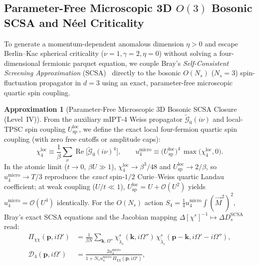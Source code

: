 \documentclass[11pt,a4paper]{article}
\numberwithin{equation}{section}
\theoremstyle{plain}
\theoremstyle{definition}
\newtheorem{approximation}{Approximation}[section]
\providecommand{\vk}{\mathbf{k}}
\providecommand{\vp}{\mathbf{p}}
\providecommand{\re}{\operatorname{Re}}
\begin{document}
\subsection{Parameter-Free Microscopic 3D $O(3)$ Bosonic SCSA and N\'eel Criticality}
\label{sec:l4_scsa}

To generate a momentum-dependent anomalous dimension $\eta > 0$ and escape Berlin--Kac
spherical criticality ($\nu = 1, \gamma = 2, \eta = 0$) without solving a four-dimensional
fermionic parquet equation, we couple Bray's \emph{Self-Consistent Screening Approximation}
(SCSA)~\cite{Bray1974} directly to the bosonic $O(N_s)$ ($N_s = 3$) spin-fluctuation
propagator in $d = 3$ using an exact, parameter-free microscopic quartic spin coupling.

\begin{approximation}[Parameter-Free Microscopic 3D Bosonic SCSA Closure (Level~IV)]
\label{approx:l4_scsa}
From the auxiliary mIPT-4 Weiss propagator $\tilde{\mathcal{G}}_0(i\nu)$ and local-TPSC
spin coupling $U_{\mathrm{sp}}^{\mathrm{loc}}$, we define the exact local four-fermion
quartic spin coupling (with zero free cutoffs or amplitude caps):
\begin{equation}
    \chi_4^{\mathrm{loc}}
    \equiv \frac{1}{\beta}\sum_{\nu} \re\!\bigl[\tilde{\mathcal{G}}_0(i\nu)^4\bigr],
    \qquad
    u_4^{\mathrm{micro}}
    \equiv \bigl(U_{\mathrm{sp}}^{\mathrm{loc}}\bigr)^4\, \max\!\bigl(\chi_4^{\mathrm{loc}}, 0\bigr).
    \label{eq:l4_u4_micro}
\end{equation}
In the atomic limit ($t \to 0$, $\beta U \gg 1$), $\chi_4^{\mathrm{loc}} \to \beta^3/48$
and $U_{\mathrm{sp}}^{\mathrm{loc}} \to 2/\beta$, so $u_4^{\mathrm{micro}} \to T/3$
reproduces the \emph{exact} spin-$1/2$ Curie--Weiss quartic Landau coefficient; at weak
coupling ($U/t \ll 1$), $U_{\mathrm{sp}}^{\mathrm{loc}} = U + \mathcal{O}(U^2)$ yields
$u_4^{\mathrm{micro}} = \mathcal{O}(U^4)$ identically. For the $O(N_s)$ action
$S_4 = \frac{1}{4} u_4^{\mathrm{micro}} \int (\vec{M}^2)^2$, Bray's exact SCSA equations
and the Jacobian mapping $\Delta[\chi^s]^{-1} \mapsto \Delta D_s^{\mathrm{SCSA}}$ read:
\begin{align}
    \Pi_{\chi\chi}(\vp, i\Omega')
    &= \frac{1}{\beta N}\sum_{\vk,\Omega''}
       \chi^s_{\tilde{\lambda}_s}(\vk, i\Omega'')\,
       \chi^s_{\tilde{\lambda}_s}(\vp - \vk, i\Omega' - i\Omega''),
    \label{eq:l4_Pixx} \\
    \mathcal{D}_4(\vp, i\Omega')
    &= \frac{2 u_4^{\mathrm{micro}}}{1 + N_s u_4^{\mathrm{micro}}\,\Pi_{\chi\chi}(\vp, i\Omega')},

\end{align}
\end{approximation}
\end{document}
